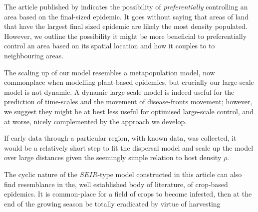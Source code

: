 The article published by \cite{time-varying-infectivity} indicates the possibility of \textit{preferentially} controlling an area based on the final-sized epidemic. It goes without saying that areas of land that have the largest final sized epidemic are likely the most density populated. However, we outline the possibility it might be more beneficial to preferentially control an area based on its spatial location and how it couples to to neighbouring areas.

The scaling up of our model resembles a metapopulation model, now commonplace when modelling plant-based epidemics, but crucially our large-scale model is not dynamic. A dynamic large-scale model is indeed useful for the prediction of time-scales and the movement of disease-fronts movement; however, we suggest they might be at best less useful for optimised large-scale control, and at worse, nicely complemented by the approach we develop.

If early data through a particular region, with known data, was collected, it would be a relatively short step to fit the dispersal model and scale up the model over large distances given the seemingly simple relation to host density $\rho$.


The cyclic nature of the $SEIR$-type model constructed in this article can also find resemblance in the, well established body of literature, of crop-based epidemics. It is common-place for a field of crops to become infested, then at the end of the growing season be totally eradicated by virtue of harvesting %


